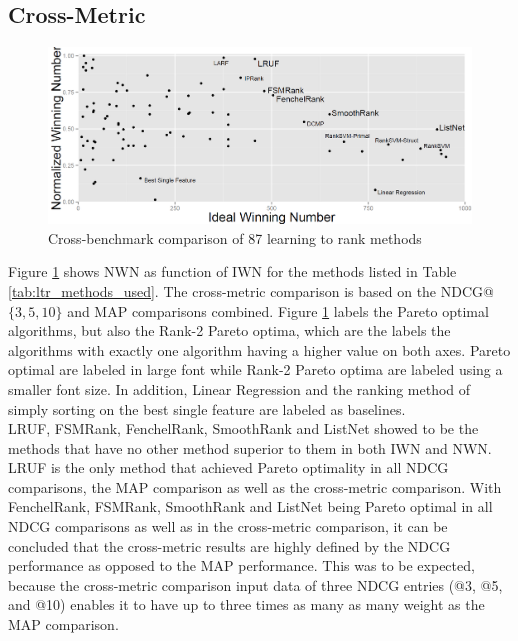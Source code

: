 \documentclass[english, authoryear, preprint]{elsarticle}
\begin{document}
\subsection{Cross-Metric}
\begin{figure}
\centering
\includegraphics[scale=0.28]{gfx/combined_normalized_winnum}
\caption{Cross-benchmark comparison of 87 learning to rank methods}
\label{fig:normalized_winning_number_all}
\end{figure}
Figure \ref{fig:normalized_winning_number_all} shows NWN as function of IWN for the methods listed in Table \ref{tab:ltr_methods_used}. The cross-metric comparison is based on the NDCG@$\{3,5,10\}$ and MAP comparisons combined. Figure \ref{fig:normalized_winning_number_all} labels the Pareto optimal algorithms, but also the Rank-2 Pareto optima, which are the labels the algorithms with exactly one algorithm having a higher value on both axes. Pareto optimal are labeled in large font while Rank-2 Pareto optima are labeled using a smaller font size. In addition, Linear Regression and the ranking method of simply sorting on the best single feature are labeled as baselines.\\

LRUF, FSMRank, FenchelRank, SmoothRank and ListNet showed to be the methods that have no other method superior to them in both IWN and NWN. LRUF is the only method that achieved Pareto optimality in all NDCG comparisons, the MAP comparison as well as the cross-metric comparison. With FenchelRank, FSMRank, SmoothRank and ListNet being Pareto optimal in all NDCG comparisons as well as in the cross-metric comparison, it can be concluded that the cross-metric results are highly defined by the NDCG performance as opposed to the MAP performance. This was to be expected, because the cross-metric comparison input data of three NDCG entries (@3, @5, and @10) enables it to have up to three times as many as many weight as the MAP comparison.\\
\end{document}
